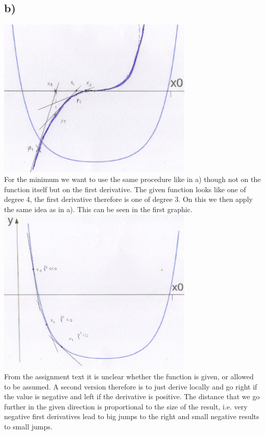 \documentclass[12pt,a4paper]{scrartcl}
\begin{document}
	\subsection*{b)}
		\includegraphics[width = 0.7\textwidth]{figure_1b.png} \\
		For the minimum we want to use the same procedure like in a) though not on the function itself but on the first derivative. The given function looks like one of degree 4, the first derivative therefore is one of degree 3. On this we then apply the same idea as in a). This can be seen in the first graphic. \\
		\includegraphics[width = 0.7\textwidth]{figure_1b_2.png} \\
		From the assignment text it is unclear whether the function is given, or allowed to be assumed. A second version therefore is to just derive locally and go right if the value is negative and left if the derivative is positive. The distance that we go further in the given direction is proportional to the size of the result, i.e. very negative first derivatives lead to big jumps to the right and small negative results to small jumps. 
\end{document}
